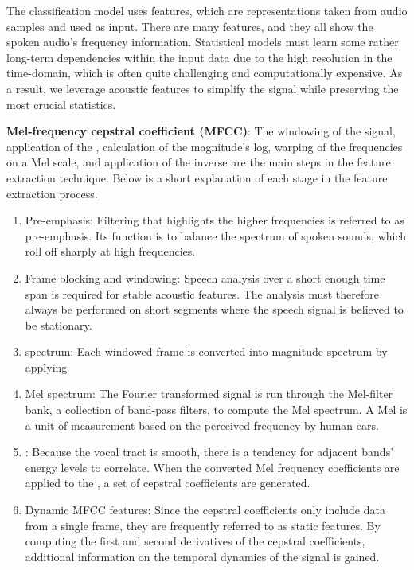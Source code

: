 The classification model uses features, which are representations taken from audio samples and used as input. 
There are many features, and they all show the spoken audio's frequency information.
Statistical models must learn some rather long-term dependencies within the input data due to the high resolution in the time-domain, which is often quite challenging and computationally expensive. 
As a result, we leverage acoustic features to simplify the signal while preserving the most crucial statistics.

\textbf{Mel-frequency cepstral coefficient (MFCC)}: The windowing of the signal, application of the , calculation of the magnitude's log, warping of the frequencies on a Mel scale, and application of the inverse  are the main steps in the  feature extraction technique. 
Below is a short explanation \cite{Rao_KE_2017} of each stage in the  feature extraction process.

\begin{enumerate}
    \item Pre-emphasis: Filtering that highlights the higher frequencies is referred to as pre-emphasis. Its function is to balance the spectrum of spoken sounds, which roll off sharply at high frequencies.
    \item Frame blocking and windowing: Speech analysis over a short enough time span is required for stable acoustic features. The analysis must therefore always be performed on short segments where the speech signal is believed to be stationary.
    \item {} spectrum: Each windowed frame is converted into magnitude spectrum by applying 
    \item Mel spectrum: The Fourier transformed signal is run through the Mel-filter bank, a collection of band-pass filters, to compute the Mel spectrum. A Mel is a unit of measurement based on the perceived frequency by human ears.
    \item {}: Because the vocal tract is smooth, there is a tendency for adjacent bands' energy levels to correlate. When the converted Mel frequency coefficients are applied to the , a set of cepstral coefficients are generated.
    \item Dynamic MFCC features: Since the cepstral coefficients only include data from a single frame, they are frequently referred to as static features. By computing the first and second derivatives of the cepstral coefficients, additional information on the temporal dynamics of the signal is gained.
\end{enumerate}

